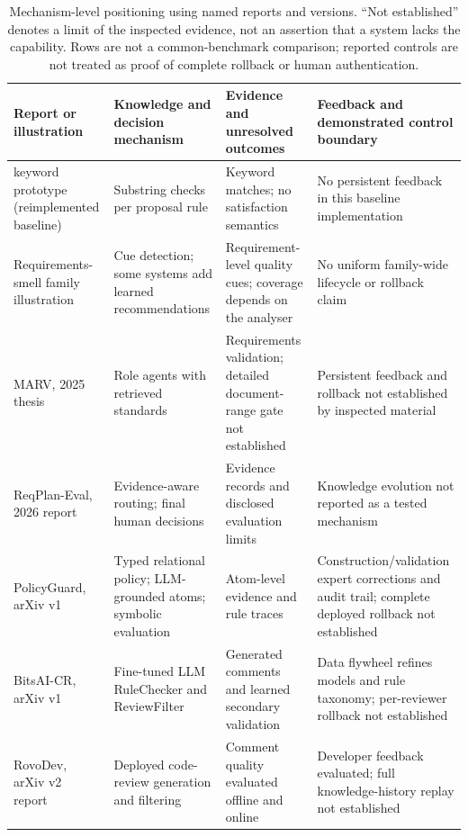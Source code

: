 \documentclass[computers,article,submit,moreauthors]{Definitions/mdpi}
\begin{document}
\begin{table}[!ht]
\caption{Mechanism-level positioning using named reports and versions. ``Not established'' denotes a limit of the inspected evidence, not an assertion that a system lacks the capability. Rows are not a common-benchmark comparison; reported controls are not treated as proof of complete rollback or human authentication.}
\label{tab:positioning}
\centering
\footnotesize
\setlength{\tabcolsep}{3pt}
\begin{tabularx}{\textwidth}{@{}>{\raggedright\arraybackslash}p{2.6cm}>{\raggedright\arraybackslash}X>{\raggedright\arraybackslash}X>{\raggedright\arraybackslash}X@{}}
\toprule
Report or illustration & Knowledge and decision mechanism & Evidence and unresolved outcomes & Feedback and demonstrated control boundary \\
\midrule
2025 keyword prototype (reimplemented baseline) & Substring checks per proposal rule & Keyword matches; no satisfaction semantics & No persistent feedback in this baseline implementation \\
Requirements-smell family illustration~\cite{femmer2017,smell2024,airreq2025} & Cue detection; some systems add learned recommendations & Requirement-level quality cues; coverage depends on the analyser & No uniform family-wide lifecycle or rollback claim \\
MARV, 2025 thesis~\cite{chinnam2025} & Role agents with retrieved standards & Requirements validation; detailed document-range gate not established & Persistent feedback and rollback not established by inspected material \\
ReqPlan-Eval, 2026 report~\cite{alsawalqah2026} & Evidence-aware routing; final human decisions & Evidence records and disclosed evaluation limits & Knowledge evolution not reported as a tested mechanism \\
PolicyGuard, arXiv v1~\cite{malik2026} & Typed relational policy; LLM-grounded atoms; symbolic evaluation & Atom-level evidence and rule traces & Construction/validation expert corrections and audit trail; complete deployed rollback not established \\
BitsAI-CR, arXiv v1~\cite{sun2025} & Fine-tuned LLM RuleChecker and ReviewFilter & Generated comments and learned secondary validation & Data flywheel refines models and rule taxonomy; per-reviewer rollback not established \\
RovoDev, arXiv v2 report~\cite{rovo2026} & Deployed code-review generation and filtering & Comment quality evaluated offline and online & Developer feedback evaluated; full knowledge-history replay not established \\

\end{tabularx}
\end{table}
\end{document}
